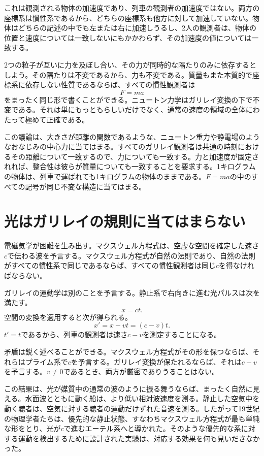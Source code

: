 これは観測される物体の加速度であり、列車の観測者の加速度ではない。両方の座標系は慣性系であるから、どちらの座標系も他方に対して加速していない。物体はどちらの記述の中でも左または右に加速しうるし、2人の観測者は、物体の位置と速度については一致しないにもかかわらず、その加速度の値については一致する。

2つの粒子が互いに力を及ぼし合い、その力が同時的な隔たりのみに依存するとしよう。その隔たりは不変であるから、力も不変である。質量もまた本質的で座標系に依存しない性質であるならば、すべての慣性観測者は
\begin{equation}
F=ma
\end{equation}
をまったく同じ形で書くことができる。ニュートン力学はガリレイ変換の下で不変である。それは単にもっともらしいだけでなく、通常の速度の領域の全体にわたって極めて正確である。

この議論は、大きさが距離の関数であるような、ニュートン重力や静電場のようなおなじみの中心力に当てはまる。すべてのガリレイ観測者は共通の時刻におけるその距離について一致するので、力についても一致する。力と加速度が固定されれば、整合性は彼らが質量についても一致することを要求する。1キログラムの物体は、列車で運ばれても1キログラムの物体のままである。\(F=ma\)の中のすべての記号が同じ不変な構造に当てはまる。

\section{光はガリレイの規則に当てはまらない}

電磁気学が困難を生み出す。マクスウェル方程式は、空虚な空間を確定した速さ\(c\)で伝わる波を予言する。マクスウェル方程式が自然の法則であり、自然の法則がすべての慣性系で同じであるならば、すべての慣性観測者は同じ\(c\)を得なければならない。

ガリレイの運動学は別のことを予言する。静止系で右向きに進む光パルスは次を満たす。
\begin{equation}
x=ct.
\end{equation}
空間の変換を適用すると次が得られる。
\begin{equation}
x'=x-vt=(c-v)t.
\end{equation}
\(t'=t\)であるから、列車の観測者は速さ\(c-v\)を測定することになる。

矛盾は鋭く述べることができる。マクスウェル方程式がその形を保つならば、それらはプライム系で\(c\)を予言する。ガリレイ変換が保たれるならば、それは\(c-v\)を予言する。\(v\ne0\)であるとき、両方が厳密でありうることはない。

この結果は、光が媒質中の通常の波のように振る舞うならば、まったく自然に見える。水面波とともに動く船は、より低い相対波速度を測る。静止した空気中を動く聴者は、空気に対する聴者の運動だけずれた音速を測る。したがって19世紀の物理学者たちは、優先的な静止状態、すなわちマクスウェル方程式が最も単純な形をとり、光が\(c\)で進むエーテル系へと導かれた。そのような優先的な系に対する運動を検出するために設計された実験は、対応する効果を何も見いださなかった。

